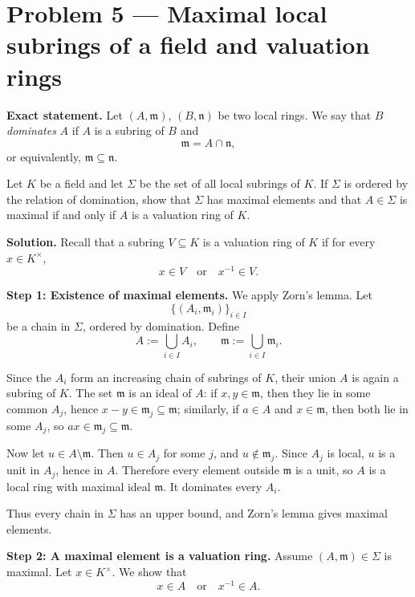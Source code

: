\documentclass[12pt,a4paper]{article}
\theoremstyle{notespace}
\begin{document}
\bigskip

\section{Problem 5 --- Maximal local subrings of a field and valuation rings}

\textbf{Exact statement.}
Let \((A,\mathfrak m)\), \((B,\mathfrak n)\) be two local rings. We say that \(B\) \emph{dominates} \(A\) if \(A\) is a subring of \(B\) and
\[
\mathfrak m=A\cap \mathfrak n,
\]
or equivalently, \(\mathfrak m\subseteq \mathfrak n\).

Let \(K\) be a field and let \(\Sigma\) be the set of all local subrings of \(K\). If \(\Sigma\) is ordered by the relation of domination, show that \(\Sigma\) has maximal elements and that \(A\in\Sigma\) is maximal if and only if \(A\) is a valuation ring of \(K\).

\textbf{Solution.}
Recall that a subring \(V\subseteq K\) is a valuation ring of \(K\) if for every \(x\in K^\times\),
\[
x\in V \quad\text{or}\quad x^{-1}\in V.
\]

\textbf{Step 1: Existence of maximal elements.}
We apply Zorn's lemma. Let
\[
\{(A_i,\mathfrak m_i)\}_{i\in I}
\]
be a chain in \(\Sigma\), ordered by domination. Define
\[
A:=\bigcup_{i\in I} A_i,
\qquad
\mathfrak m:=\bigcup_{i\in I}\mathfrak m_i.
\]

Since the \(A_i\) form an increasing chain of subrings of \(K\), their union \(A\) is again a subring of \(K\). The set \(\mathfrak m\) is an ideal of \(A\): if \(x,y\in \mathfrak m\), then they lie in some common \(A_j\), hence \(x-y\in \mathfrak m_j\subseteq \mathfrak m\); similarly, if \(a\in A\) and \(x\in \mathfrak m\), then both lie in some \(A_j\), so \(ax\in \mathfrak m_j\subseteq \mathfrak m\).

Now let \(u\in A\setminus \mathfrak m\). Then \(u\in A_j\) for some \(j\), and \(u\notin \mathfrak m_j\). Since \(A_j\) is local, \(u\) is a unit in \(A_j\), hence in \(A\). Therefore every element outside \(\mathfrak m\) is a unit, so \(A\) is a local ring with maximal ideal \(\mathfrak m\). It dominates every \(A_i\).

Thus every chain in \(\Sigma\) has an upper bound, and Zorn's lemma gives maximal elements.

\medskip

\textbf{Step 2: A maximal element is a valuation ring.}
Assume \((A,\mathfrak m)\in \Sigma\) is maximal. Let \(x\in K^\times\). We show that
\[
x\in A \quad\text{or}\quad x^{-1}\in A.
\]
\end{document}
